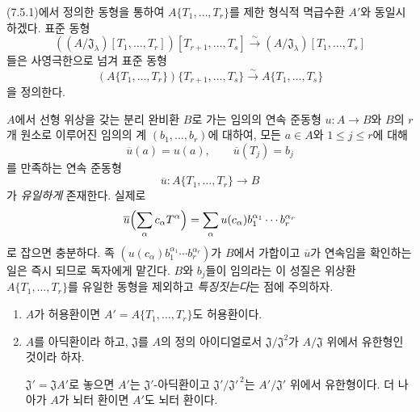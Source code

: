 \begin{env}[7.5.2]
\label{0.7.5.2-ko}
(7.5.1)에서 정의한 동형을 통하여 $A\{T_1,\ldots,T_r\}$를 제한
형식적 멱급수환 $A'$와 동일시하겠다. 표준 동형
\[
  ((A/\mathfrak J_\lambda)[T_1,\ldots,T_r])
  [T_{r+1},\ldots,T_s]
  \xrightarrow{\sim}
  (A/\mathfrak J_\lambda)[T_1,\ldots,T_s]
\]
들은 사영극한으로 넘겨 표준 동형
\[
  (A\{T_1,\ldots,T_r\})\{T_{r+1},\ldots,T_s\}
  \xrightarrow{\sim}
  A\{T_1,\ldots,T_s\}
\]
을 정의한다.
\end{env}

\begin{env}[7.5.3]
\label{0.7.5.3-ko}
$A$에서 선형 위상을 갖는 분리 완비환 $B$로 가는 임의의 연속
준동형 $u:A\to B$와 $B$의 $r$개 원소로 이루어진 임의의 계
$(b_1,\ldots,b_r)$에 대하여, 모든 $a\in A$와 $1\leq j\leq r$에
대해
\[
  \overline u(a)=u(a),\qquad \overline u(T_j)=b_j
\]
를 만족하는 연속 준동형
\[
  \overline u:A\{T_1,\ldots,T_r\}\longrightarrow B
\]
가 \emph{유일하게} 존재한다. 실제로
\[
  \overline u\Bigl(\sum_\alpha c_\alpha T^\alpha\Bigr)
  =\sum_\alpha u(c_\alpha)b_1^{\alpha_1}\cdots b_r^{\alpha_r}
\]
로 잡으면 충분하다. 족
$(u(c_\alpha)b_1^{\alpha_1}\cdots b_r^{\alpha_r})$가 $B$에서
가합이고 $\overline u$가 연속임을 확인하는 일은 즉시 되므로
독자에게 맡긴다. $B$와 $b_j$들이 임의라는 이 성질은 위상환
$A\{T_1,\ldots,T_r\}$를 유일한 동형을 제외하고
\emph{특징짓는다}는 점에 주의하자.
\end{env}

\begin{proposition}[7.5.4]
\label{0.7.5.4-ko}
\begin{enumerate}
  \item[(i)] $A$가 허용환이면
    $A'=A\{T_1,\ldots,T_r\}$도 허용환이다.
  \item[(ii)] $A$를 아딕환이라 하고, $\mathfrak J$를 $A$의 정의
    아이디얼로서 $\mathfrak J/\mathfrak J^2$가
    $A/\mathfrak J$ 위에서 유한형인 것이라 하자.


    $\mathfrak J'=\mathfrak JA'$로 놓으면 $A'$는
    $\mathfrak J'$-아딕환이고
    $\mathfrak J'/\mathfrak J'^{\,2}$는
    $A'/\mathfrak J'$ 위에서 유한형이다. 더 나아가 $A$가 뇌터
    환이면 $A'$도 뇌터 환이다.
\end{enumerate}
\end{proposition}

